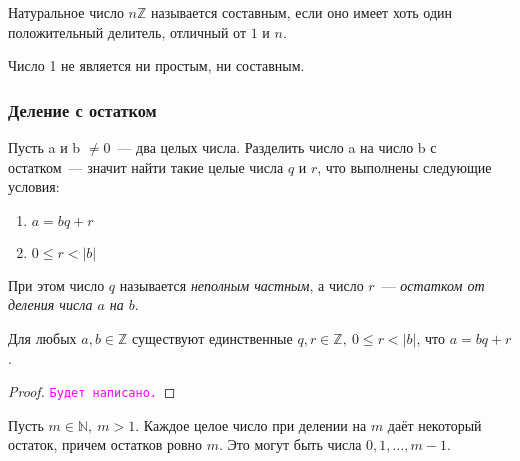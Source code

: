 \documentclass[11pt]{article}
\begin{document}
\begin{definition}

	Натуральное число $n \mathbb{Z}$ называется составным, если оно имеет хоть один положительный делитель, отличный от $1$ и $n$.

\end{definition}

\begin{remark}

	Число 1 не является ни простым, ни составным.

\end{remark}

\subsubsection{Деление с остатком}

\begin{definition}
    Пусть a и b $\neq 0$~--- два целых числа. Разделить число  a на число b с остатком~--- значит найти такие целые числа $q$ и $r$, что выполнены следующие условия:

	\begin{enumerate}

	    \item $a = bq + r$

		\item $0 \le r < |b|$

	\end{enumerate}

	При этом число $q$ называется \emph{неполным частным}, а число $r$~--- \emph{остатком от деления числа $a$ на $b$}.

\end{definition}

\begin{theorem}

    Для любых $a, b \in \mathbb{Z}$ существуют единственные $q, r \in \mathbb{Z}, \ 0 \le r < |b|$, что $a = bq + r$.

\end{theorem}

\begin{proof}

    \textcolor{magenta}{\texttt{Будет написано.}}

\end{proof}

\begin{corollary}

	Пусть $m \in \mathbb{N}, \ m > 1$. Каждое целое число при делении на $m$ даёт некоторый остаток, причем остатков ровно $m$.
	Это могут быть числа $0, 1, \ldots, m - 1$.

\end{corollary}
\end{document}
